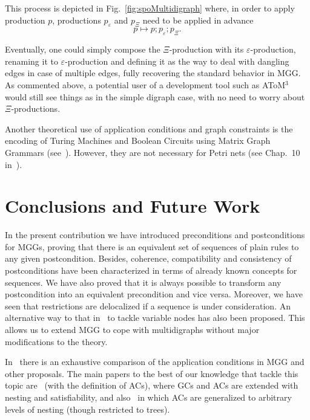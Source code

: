 \documentclass{fundam}
\begin{document}
This process is depicted in Fig.~\ref{fig:spoMultidigraph} where, in
order to apply production $p$, productions $p_\varepsilon$ and $p_\Xi$
need to be applied in advance
\begin{equation}
  p \longmapsto p; p_\varepsilon; p_\Xi.
\end{equation}

Eventually, one could simply compose the $\Xi$-production with its
$\varepsilon$-production, renaming it to $\varepsilon$-production and
defining it as the way to deal with dangling edges in case of multiple
edges, fully recovering the standard behavior in MGG. As commented
above, a potential user of a development tool such as AToM$^3$ would
still see things as in the simple digraph case, with no need to worry
about $\Xi$-productions.

Another theoretical use of application conditions and graph
constraints is the encoding of Turing Machines and Boolean
Circuits using Matrix Graph Grammars (see~\cite{MGGmodel}). However,
they are not necessary for Petri nets (see Chap.~10
in~\cite{MGGBook}).

\section{Conclusions and Future Work}
\label{sec:conclusions}


In the present contribution we have introduced preconditions and
postconditions for MGGs, proving that there is an equivalent set of
sequences of plain rules to any given postcondition. Besides,
coherence, compatibility and consistency of postconditions have been
characterized in terms of already known concepts for sequences. We
have also proved that it is always possible to transform any
postcondition into an equivalent precondition and vice
versa. Moreover, we have seen that restrictions are delocalized if a
sequence is under consideration. An alternative way to that
in~\cite{Hof05} to tackle variable nodes has also been proposed. This
allows us to extend MGG to cope with multidigraphs without major
modifications to the theory.

In~\cite{MGGfundamenta} there is an exhaustive comparison of the
application conditions in MGG and other proposals. The main papers to
the best of our knowledge that tackle this topic are~\cite{AC:Ehrig}
(with the definition of ACs), \cite{Habel, HP09} where GCs and ACs are
extended with nesting and satisfiability, and also~\cite{Rensink} in
which ACs are generalized to arbitrary levels of nesting (though
restricted to trees).
\end{document}

